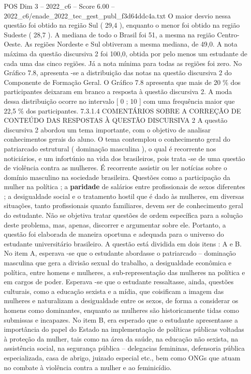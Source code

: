 \begin{textsample}{POS Dim 3 – 2022\_c6 – Score 6.00 – 2022\_c6/enade\_2022\_tec\_gest\_publ\_f3d64ddc4a.txt}
O maior desvio nessa questão foi obtido na região Sul ( 29,4 ), enquanto o menor foi obtido na região Sudeste ( 28,7 ).
A mediana de todo o Brasil foi 51, a mesma na região Centro-Oeste.
As regiões Nordeste e Sul obtiveram a mesma mediana, de 49,0.
A nota máxima da questão discursiva 2 foi 100,0, obtida por pelo menos um estudante de cada uma das cinco regiões.
Já a nota mínima para todas as regiões foi zero.
No Gráfico 7.8, apresenta -se a distribuição das notas na questão discursiva 2 do Componente de Formação Geral.
O Gráfico 7.8 apresenta que mais de 20 \% dos participantes deixaram em branco a resposta à questão discursiva 2.
A moda dessa distribuição ocorre no intervalo [ 0 ; 10 ] com uma frequência maior que 22,5 \% dos participantes. 7.3.1.4 COMENTÁRIOS SOBRE A CORREÇÃO DE CONTEÚDO DAS RESPOSTAS À QUESTÃO DISCURSIVA 2 A questão discursiva 2 abordou um tema importante, com o objetivo de analisar conhecimentos gerais do aluno.
O tema contemplou o conhecimento geral do patriarcado estrutural ( dominação masculina ), o qual é recorrente nos noticiários, e um infortúnio na vida dos brasileiros, pois trata -se de uma questão de violência contra as mulheres.
É recorrente assistir ou ler notícias sobre o domínio masculino na sociedade brasileira.
Questões como a participação da mulher na política ; a \textbf{paridade} de salários entre profissionais de sexos diferentes ; a desigualdade social e o tratamento hostil que é dado às mulheres, em diversas situações, tanto profissionais quanto familiares, devem ser de conhecimento geral do estudante.
Não se objetiva tratar questões de ordem específica para a solução deste problema, mas, apenas, discorrer e argumentar sobre ele.
Portanto, a questão foi elaborada de maneira oportuna e adequada para o universo do estudante universitário brasileiro.
A questão está dividida em dois itens : A e B.
No item A, esperava -se que o estudante abordasse o patriarcado – dominação masculina que gera a divisão sexual do trabalho, a desigualdade econômica e política, entre homens e mulheres, a sub-representação das mulheres na política e em cargos de poder.
Esperava -se que o estudante ressaltasse, ainda, questões culturais, como a educação sexista e a mídia, que coisificam a imagem das mulheres e naturalizam a desigualdade entre os sexos, de forma a considerar os homens como dominantes, enquanto as mulheres são historicamente tidas como submissas e incapazes.
No item B, era esperado que o estudante apresentasse a importância do papel do Estado na implementação de políticas públicas voltadas à proteção da mulher, tais como na área da saúde, na educação não sexista, na assistência social, na segurança pública – delegacias femininas, defensoria pública especializada, casa de abrigo, juizado especial etc., bem como ONGs que atuam no combate à violência contra a mulher e ao feminicídio.

\end{textsample}

